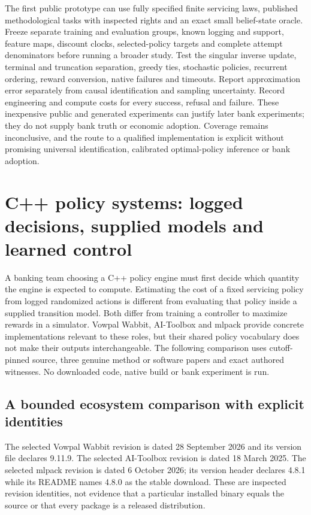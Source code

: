 The first public prototype can use fully specified finite servicing laws, published methodological tasks with inspected rights and an exact small belief-state oracle. Freeze separate training and evaluation groups, known logging and support, feature maps, discount clocks, selected-policy targets and complete attempt denominators before running a broader study. Test the singular inverse update, terminal and truncation separation, greedy ties, stochastic policies, recurrent ordering, reward conversion, native failures and timeouts. Report approximation error separately from causal identification and sampling uncertainty. Record engineering and compute costs for every success, refusal and failure. These inexpensive public and generated experiments can justify later bank experiments; they do not supply bank truth or economic adoption. Coverage remains inconclusive, and the route to a qualified implementation is explicit without promising universal identification, calibrated optimal-policy inference or bank adoption.~\citep{exec24_policyjava_comparison}


\section{C++ policy systems: logged decisions, supplied models and learned control}
\label{sec:exec24-policy-cxx}
A banking team choosing a C++ policy engine must first decide which quantity the engine is expected to compute. Estimating the cost of a fixed servicing policy from logged randomized actions is different from evaluating that policy inside a supplied transition model. Both differ from training a controller to maximize rewards in a simulator. Vowpal Wabbit, AI-Toolbox and mlpack provide concrete implementations relevant to these roles, but their shared policy vocabulary does not make their outputs interchangeable. The following comparison uses cutoff-pinned source, three genuine method or software papers and exact authored witnesses. No downloaded code, native build or bank experiment is run.~\citep{exec24_policycxx_vw,exec24_policycxx_aitoolbox,exec24_policycxx_mlpack,exec24_policycxx_comparison}

\subsection{A bounded ecosystem comparison with explicit identities}
The selected Vowpal Wabbit revision is dated 28 September 2026 and its version file declares 9.11.9. The selected AI-Toolbox revision is dated 18 March 2025. The selected mlpack revision is dated 6 October 2026; its version header declares 4.8.1 while its README names 4.8.0 as the stable download. These are inspected revision identities, not evidence that a particular installed binary equals the source or that every package is a released distribution.~\citep{exec24_policycxx_vw,exec24_policycxx_aitoolbox,exec24_policycxx_mlpack}

